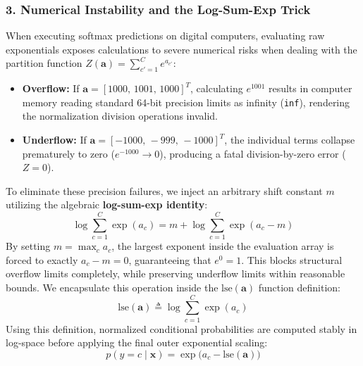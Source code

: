 \documentclass{article}
\begin{document}
\subsubsection*{3. Numerical Instability and the Log-Sum-Exp Trick}
When executing softmax predictions on digital computers, evaluating raw exponentials exposes calculations to severe numerical risks when dealing with the partition function $Z(\boldsymbol{a}) = \sum_{c'=1}^C e^{a_{c'}}$:
\begin{itemize}
    \item \textbf{Overflow:} If $\boldsymbol{a} = [1000, \, 1001, \, 1000]^T$, calculating $e^{1001}$ results in computer memory reading standard 64-bit precision limits as infinity (\texttt{inf}), rendering the normalization division operations invalid.
    \item \textbf{Underflow:} If $\boldsymbol{a} = [-1000, \, -999, \, -1000]^T$, the individual terms collapse prematurely to zero ($e^{-1000} \to 0$), producing a fatal division-by-zero error ($Z = 0$).
\end{itemize}
To eliminate these precision failures, we inject an arbitrary shift constant $m$ utilizing the algebraic \textbf{log-sum-exp identity}:
\begin{equation}
    \log \sum_{c=1}^{C} \exp(a_c) = m + \log \sum_{c=1}^{C} \exp(a_c - m)
\end{equation}
By setting $m = \max_c a_c$, the largest exponent inside the evaluation array is forced to exactly $a_c - m = 0$, guaranteeing that $e^0 = 1$. This blocks structural overflow limits completely, while preserving underflow limits within reasonable bounds. We encapsulate this operation inside the $\text{lse}(\boldsymbol{a})$ function definition:
\begin{equation}
    \text{lse}(\boldsymbol{a}) \triangleq \log \sum_{c=1}^{C} \exp(a_c)
\end{equation}
Using this definition, normalized conditional probabilities are computed stably in log-space before applying the final outer exponential scaling:
\begin{equation}
    p(y = c \mid \boldsymbol{x}) = \exp\big(a_c - \text{lse}(\boldsymbol{a})\big)
\end{equation}
\end{document}
